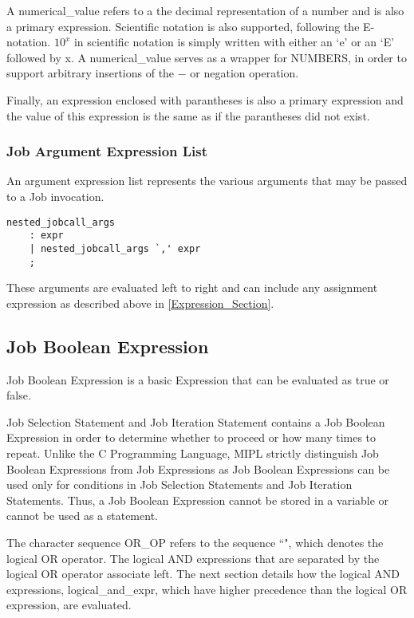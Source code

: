 \documentclass[prodmode,acmtecs]{acmsmall}
\begin{document}
A numerical_value refers to a the decimal representation of a number and is also a 
primary expression. Scientific notation is also supported, following the 
E-notation. $10^{x}$ in scientific notation is simply written with either an
`e' or an `E' followed by x. A numerical_value serves as a wrapper for NUMBERS, in 
order to support arbitrary insertions of the $-$ or negation operation.

Finally, an expression enclosed with parantheses is also a primary expression 
and the value of this expression is the same as if the parantheses did not 
exist.
\medskip

\subsubsection{Job Argument Expression List}

An argument expression list represents the various arguments that may be
passed to a Job invocation. 

\begin{lstlisting}
nested_jobcall_args
	: expr
	| nested_jobcall_args `,' expr
	;
\end{lstlisting}

These arguments are evaluated left to right and can include any assignment 
expression as described above in \ref{Expression_Section}.
\medskip

\subsection{Job Boolean Expression}

Job Boolean Expression is a basic Expression that can be evaluated as
true or false.

Job Selection Statement and Job Iteration Statement
contains a Job Boolean Expression in order to determine whether to proceed
or how many times to repeat.  Unlike the C Programming Language, MIPL strictly
distinguish Job Boolean Expressions from Job Expressions as Job Boolean
Expressions can be used only for conditions in Job Selection Statements
and Job Iteration Statements.  Thus, a Job Boolean Expression cannot be
stored in a variable or cannot be used as a statement.

The character sequence OR\_OP refers to the sequence ``\textbardbl", which  
denotes the logical OR operator. The logical AND expressions that are 
separated by the logical OR operator associate left. The next section 
details how the logical AND expressions, logical\_and\_expr, which have 
higher precedence than the logical OR expression, are evaluated. 
\end{document}
